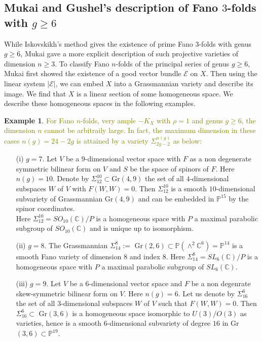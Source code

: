 \documentclass[11pt]{amsart}
\theoremstyle{plain}
\theoremstyle{definition}
\newtheorem{example}[theorem]{Example}
\theoremstyle{expl}
\begin{document}
\subsection{Mukai and Gushel's description of Fano $3$-folds with $g\geq 6$}
While Iskovskikh's method gives the existence of prime Fano $3$-folds with genus $g \geq 6$, Mukai gave a more explicit description of such projective varieties of dimension $n\geq 3$. 
To classify Fano $n$-folds of the principal series of genus $g \geq 6$, Mukai first showed the existence of a good vector bundle $\mathcal{E}$ on $X$. Then using the linear system $|\mathcal{E}|$, we can embed $X$ into a Grassmannian variety and describe its image. We find that $X$ is a linear section of some homogeneous space. We describe these homogeneous spaces in the following examples.

\begin{example}
	\textcolor{olive}{For Fano $n$-folds, very ample $-K_X$ with $\rho=1$ and genus $g\geq 6$, the dimension $n$ cannot be arbitraily large. In fact, the maximum dimension in these cases $n(g)=24-2g$ is attained by a variety $\Sigma_{2g-2}^{n(g)}$ as below:}
\begin{enumerate}
\item[(i)] $g=7$. Let $V$ be a $9$-dimensional vector space with $F$ as a non degenerate symmetric bilinear form on $V$ and $S$ be the space of spinors of $F$. Here $n(g)=10$. Denote by $\Sigma_{12}^{10} \subset $Gr$(4,9)$ the set of all $4$-dimensional subspaces $W$ of $V$ with $F(W,W)=0$. Then $\Sigma_{12}^{10}$ is a smooth $10$-dimensional subvariety of Grassmannian Gr$(4,9)$ and can be embedded in $\mathbb{P}^{15}$ by the spinor coordinates. \\
Here $\Sigma^{10}_{12} = SO_{10}(\mathbb{C})/P$ is a homogeneous space with $P$ a maximal parabolic subgroup of $SO_{10}(\mathbb{C})$ and is unique up to isomorphism.
\item[(ii)] $g=8$. The Grassmannian $\Sigma^8_{14}:=$ Gr$(2,6) \subset \mathbb{P}(\wedge^2 \mathbb{C}^6) = \mathbb{P}^{14}$ is a smooth Fano variety of dimension $8$ and index $8$.  Here $\Sigma^8_{14} = SL_6(\mathbb{C})/P$ is a homogeneous space with $P$ a maximal parabolic subgroup of $SL_6(\mathbb{C})$.
      \item[(iii)] $g=9$. Let $V$ be a $6$-dimensional vector space and $F$ be a non degenrate skew-symmetric bilinear form on $V$. Here $n(g)=6$. Let us denote by $\Sigma_{16}^6$ the set of all $3$-dimensional subspaces $W$ of $V$ such that $F(W,W)=0$. Then $\Sigma_{16}^6 \subset $ Gr$(3,6)$ is a homogeneous space isomorphic to $U(3)/O(3)$ as varieties, hence is a smooth $6$-dimensional subvariety of degree $16$ in Gr$(3,6)\subset  \mathbb{P}^{19}$.

\end{enumerate}
\end{example}
\end{document}
